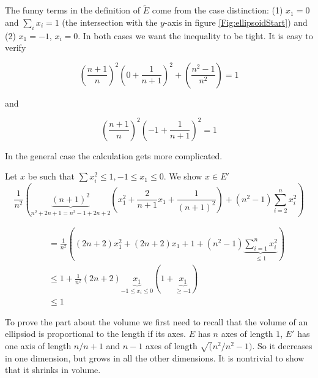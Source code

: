 \begin{pr} The funny terms in the definition of $\tilde E$ come from the case distinction: (1) $x_1=0$ and $\sum_i x_i=1$ (the intersection with the $y$-axis in figure \ref{Fig:ellipsoidStart}) and (2) $x_1=-1$, $x_i=0$. In both cases we want the inequality to be tight. It is easy to verify

\[\left(\frac{n+1}{n}\right)^2\left(0+\frac{1}{n+1}\right)^2+\left(\frac{n^2-1}{n^2}\right) = 1\]

and

\[\left(\frac{n+1}{n}\right)^2\left(-1+\frac{1}{n+1}\right)^2 = 1\]

In the general case the calculation gets more complicated.

Let $x$ be such that $\sum x_i^2\leq 1, -1\leq x_1\leq 0$. We show $x\in E'$
\[\frac{1}{n^2} \left( \underbrace{(n+1)^2}_{n^2+2n+1=n^2-1+2n+2} \left(x_1^2 + \frac{2}{n+1} x_1 + \frac{1}{(n+1)^2}\right) + (n^2-1)\sum_{i=2}^n x_i^2 \right)\]

\begin{align*}
\quad &= \frac{1}{n^2} \left((2n+2)x_1^2 + (2n+2)x_1+1+(n^2-1)\underbrace{\sum_{i=1}^n x_i^2}_{\leq 1} \right)\\
\quad &\leq 1+\frac{1}{n^2}(2n+2)\underbrace{x_1}_{-1\leq x_i\leq 0}(1+\underbrace{x_1}_{\geq -1})\\
\quad &\leq 1
\end{align*}

To prove the part about the volume we first need to recall that the volume of an ellipsiod is proportional to the length if its axes. $E$ has $n$ axes of length $1$, $E'$ has one axis of length $n/n+1$ and $n-1$ axes of length $\sqrt(n^2/n^2-1)$. So it decreases in one dimension, but grows in all the other dimensions. It is nontrivial to show that it shrinks in volume.


\end{pr}
